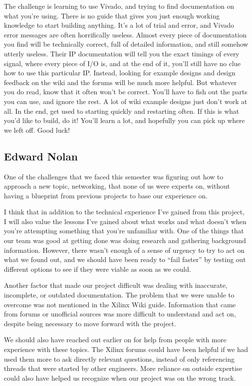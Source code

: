 \documentclass[12pt]{report}
\begin{document}
The challenge is learning to use Vivado, and trying to find documentation on what you're using. There is no guide that gives you just enough working knowledge to start building anything. It's a lot of trial and error, and Vivado error messages are often horrifically useless.
Almost every piece of documentation you find will be technically correct, full of detailed information, and still somehow utterly useless.
Their IP documentation will tell you the exact timings of every signal, where every piece of I/O is, and at the end of it, you'll still have no clue how to use this particular IP. Instead, looking for example designs and design feedback on the wiki and the forums will be much more helpful. But whatever you do read, know that it often won't be correct. You'll have to fish out the parts you can use, and ignore the rest. A lot of wiki example designs just don't work at all. In the end, get used to starting quickly and restarting often. If this is what you'd like to build, do it! You'll learn a lot, and hopefully you can pick up where we left off. Good luck!

\subsection{Edward Nolan}
One of the challenges that we faced this semester was figuring out how to approach a new topic, networking, that none of us were experts on, without having a blueprint from previous projects to base our experience on.

I think that in addition to the technical experience I've gained from this project, I will also value the lessons I've gained about what works and what doesn't when you're attempting something that you're unfamiliar with. One of the things that our team was good at getting done was doing research and gathering background information. However, there wasn't enough of a sense of urgency to try to act on what we found out, and we should have been ready to ``fail faster'' by testing out different options to see if they were viable as soon as we could.

Another factor that made our project difficult was dealing with inaccurate, incomplete, or outdated documentation. The problem that we were unable to overcome was not mentioned in the Xilinx Wiki guide. Information that came from forums or unofficial sources was more difficult to understand and act on, despite being necessary to move forward with the project. 

We should also have reached out earlier on for help from people with more experience with these topics. The Xilinx forums could have been helpful if we had used them more to ask directly relevant questions, instead of only referencing threads that were started by other engineers. More reliance on outside expertise could also have helped us recognize when our project was on the wrong track.
\end{document}
